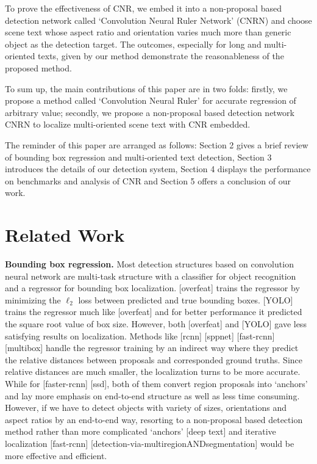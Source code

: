 \documentclass[10pt,twocolumn,letterpaper]{article}
\begin{document}
	To prove the effectiveness of CNR, we embed it into a non-proposal based detection network called `Convolution Neural Ruler Network' (CNRN) and choose scene text whose aspect ratio and orientation varies much more than generic object as the detection target. The outcomes, especially for long and multi-oriented texts, given by our method demonstrate the reasonableness of the proposed method.

	To sum up, the main contributions of this paper are in two folds: firstly, we propose a method called `Convolution Neural Ruler' for accurate regression of arbitrary value; secondly, we propose a non-proposal based detection network CNRN to localize multi-oriented scene text with CNR embedded. 
	
	The reminder of this paper are arranged as follows: Section 2 gives a brief review of bounding box regression and multi-oriented text detection, Section 3 introduces the details of our detection system, Section 4 displays the performance on benchmarks and analysis of CNR and Section 5 offers a conclusion of our work.

\section{Related Work}
	\noindent \textbf{Bounding box regression.} 
	Most detection structures based on convolution neural network are multi-task structure with a classifier for object recognition and a regressor for bounding box localization.
	[overfeat] trains the regressor by minimizing the $\ell_2$ loss between predicted and true bounding boxes. 
	[YOLO] trains the regressor much like [overfeat] and for better performance it predicted the square root value of box size. However, both [overfeat] and [YOLO] gave less satisfying results on localization. 
	Methods like [rcnn] [sppnet] [fast-rcnn] [multibox] handle the regressor training by an indirect way where they predict the relative distances between proposals and corresponded ground truths. Since relative distances are much smaller, the localization turns to be more accurate.
	While for [faster-rcnn] [ssd], both of them convert region proposals into `anchors' and lay more emphasis on end-to-end structure as well as less time consuming.
	However, if we have to detect objects with variety of sizes, orientations and aspect ratios by an end-to-end way, resorting to a non-proposal based detection method rather than more complicated `anchors' [deep text] and iterative localization [fast-rcnn] [detection-via-multiregionANDsegmentation] would be more effective and efficient.
\end{document}
